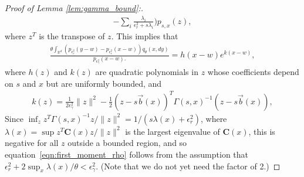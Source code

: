 \documentclass[EJP]{ejpecp} %
\newcommand{\IR}{\mathbb R}
\newcommand{\meanq}{\vec b}    %
\newcommand{\covq}{\mathbf{C}}     %
\begin{document}
\begin{proof}[Proof of Lemma \ref{lem:gamma_bound}:]
\begin{align*}
            -
            \sum_i \frac{\lambda_i}{\epsilon_r^2 + s \lambda_i}
        \bigg)
        p_{s, x}(z) ,
    \end{align*}
    where $z^T$ is the transpose of $z$.
    This implies that
    \begin{align*}
        \frac{
        \theta
            \int_{\IR^d}
                ( p_{\epsilon_r^2}(y-w) - p_{\epsilon_r^2}(x-w) )
            q_\theta(x, dy)
        }{
            p_{\epsilon^2_\gamma}(x-w) .
        }
        =
        h(x-w) e^{k(x-w)},
    \end{align*}
    where $h(z)$ and $k(z)$ are quadratic polynomials in $z$
    whose coefficients depend on $s$ and $x$ but are uniformly bounded,
    and
    \begin{align*}
        k(z)
        =
        \frac{1}{2\epsilon_\gamma^2} \|z\|^2
        -\frac{1}{2} (z - s\meanq(x))^T \Gamma(s,x)^{-1} (z - s\meanq(x)) ,
    \end{align*}
    Since $\inf_z z^T \Gamma(s,x)^{-1} z / \|z\|^2 = 1 / (s \lambda(x) + \epsilon_r^2)$,
    where $\lambda(x) = \sup z^T \covq(x) z / \|z\|^2$ is the largest eigenvalue of $\covq(x)$,
    this is negative for all $z$ outside a bounded region, and so
    equation~\eqref{eqn:first_moment_rho} follows from the assumption
    that $\epsilon_r^2 + 2 \sup_x \lambda(x)/\theta < \epsilon_\gamma^2$.
    (Note that we do not yet need the factor of 2.)


\end{proof}
\end{document}
